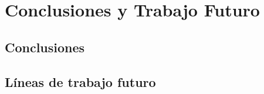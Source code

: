 \chapter{Conclusiones y Trabajo Futuro}

\section{Conclusiones}

\section{Líneas de trabajo futuro}
